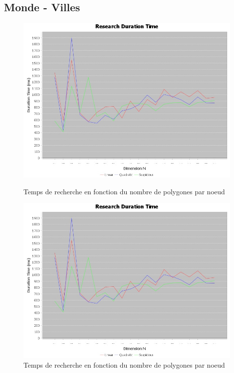 \documentclass {article}
\begin{document}
\newpage
\subsection {Monde - Villes}\label{mondeVilles}
\begin{figure}[h]
    \begin{minipage}[t]{0.46\textwidth}
	\centering
	\includegraphics[width=\textwidth]{research_graph_belgium.png}
	\caption{Temps de recherche en fonction du nombre de polygones par noeud}
	\label{fig:belgique_stat_find_lin}
    \end{minipage}
    \begin{minipage}[t]{0.46\textwidth}
	\centering
	\includegraphics[width=\textwidth]{research_graph_belgium.png}
	\caption{Temps de recherche en fonction du nombre de polygones par noeud}
	\label{fig:belgique_stat_find_quad}
    \end{minipage}
\end{figure}
\end{document}
